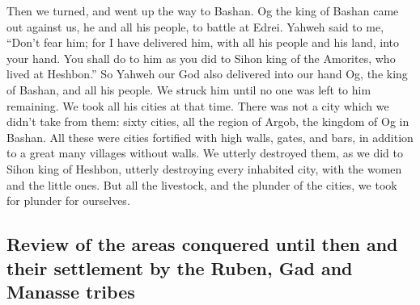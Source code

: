  Then we turned, and went up the way to Bashan. Og the
king of Bashan came out against us, he and all his people, to battle at
Edrei.  Yahweh said to me, ``Don't fear him; for I have
delivered him, with all his people and his land, into your hand. You
shall do to him as you did to Sihon king of the Amorites, who lived at
Heshbon.''  So Yahweh our God also delivered into our hand
Og, the king of Bashan, and all his people. We struck him until no one
was left to him remaining.  We took all his cities at that
time. There was not a city which we didn't take from them: sixty cities,
all the region of Argob, the kingdom of Og in Bashan.  All
these were cities fortified with high walls, gates, and bars, in
addition to a great many villages without walls.  We
utterly destroyed them, as we did to Sihon king of Heshbon, utterly
destroying every inhabited city, with the women and the little ones.
 But all the livestock, and the plunder of the cities, we
took for plunder for ourselves.

\hypertarget{review-of-the-areas-conquered-until-then-and-their-settlement-by-the-ruben-gad-and-manasse-tribes}{%
\subsection{Review of the areas conquered until then and their
settlement by the Ruben, Gad and Manasse
tribes}\label{review-of-the-areas-conquered-until-then-and-their-settlement-by-the-ruben-gad-and-manasse-tribes}}


